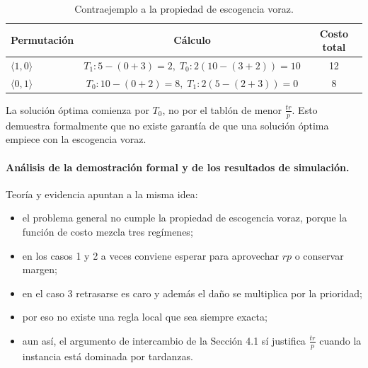 \documentclass[12pt,a4paper]{article}
\begin{document}
\begin{table}[ht]
  \centering
  \small
  \begin{tabular}{lcc}
    \toprule
    Permutaci\'on & C\'alculo & Costo total \\
    \midrule
    \(\langle 1,0\rangle\) & \(T_1: 5-(0+3)=2,\; T_0:2(10-(3+2))=10\) & 12 \\
    \(\langle 0,1\rangle\) & \(T_0: 10-(0+2)=8,\; T_1:2(5-(2+3))=0\) & 8 \\
    \bottomrule
  \end{tabular}
  \caption{Contraejemplo a la propiedad de escogencia voraz.}
\end{table}

La soluci\'on \'optima comienza por \(T_0\), no por el tabl\'on de menor \(\frac{tr}{p}\). Esto demuestra formalmente que no existe garant\'ia de que una soluci\'on \'optima empiece con la escogencia voraz.

\paragraph{An\'alisis de la demostraci\'on formal y de los resultados de simulaci\'on.}
Teor\'ia y evidencia apuntan a la misma idea:
\begin{itemize}
  \item el problema general no cumple la propiedad de escogencia voraz, porque la funci\'on de costo mezcla tres reg\'imenes;
  \item en los casos 1 y 2 a veces conviene esperar para aprovechar \(rp\) o conservar margen;
  \item en el caso 3 retrasarse es caro y adem\'as el da\~no se multiplica por la prioridad;
  \item por eso no existe una regla local que sea siempre exacta;
  \item aun as\'i, el argumento de intercambio de la Secci\'on 4.1 s\'i justifica \(\frac{tr}{p}\) cuando la instancia est\'a dominada por tardanzas.
\end{itemize}
\end{document}
